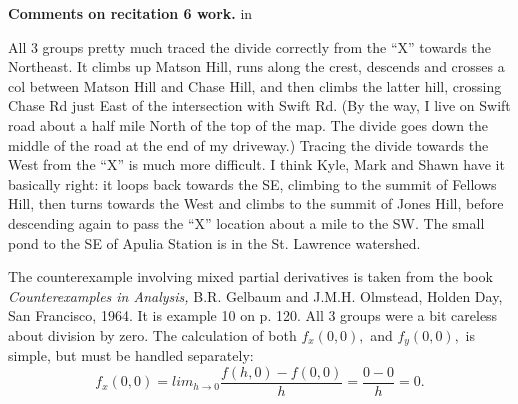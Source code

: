 {\bf Comments on recitation 6 work.}
 in

All 3 groups pretty much traced the divide correctly from the ``X'' towards
the Northeast. It climbs up Matson Hill, runs along the crest, descends
and crosses a col between Matson Hill and Chase Hill, and then climbs the
latter hill, crossing Chase Rd just East of the intersection with
Swift Rd. (By the way, I live on Swift road about a half mile North of the
top of the map. The divide goes down the middle of the road at the end
of my driveway.) Tracing the divide towards the West from the ``X'' is
much more difficult. I think Kyle, Mark and Shawn have it basically right:
it loops back towards the SE, climbing to the summit of Fellows Hill, then
turns towards the West and climbs to the summit of Jones Hill, before
descending again to pass the ``X'' location about a mile to the SW.
The small pond to the SE of Apulia Station is in the St. Lawrence watershed.

The counterexample involving mixed partial derivatives is taken from
the book {\it Counterexamples in Analysis,} B.R. Gelbaum and J.M.H. Olmstead,
Holden Day, San Francisco, 1964. It is example 10 on p. 120. All 3 groups
were a bit careless about division by zero. The calculation of both
$f_x(0,0),$ and $f_y(0,0),$ is simple, but must be handled separately:
$$
f_x(0,0) = lim_{h\to 0}\frac{f(h,0) - f(0,0)}h = \frac{0-0}h = 0.
$$

\bye
